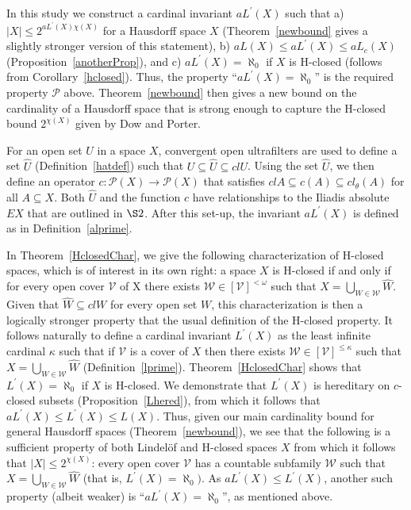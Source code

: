 \documentclass[11pt]{amsart}
\theoremstyle{definition}
\theoremstyle{remark}
\numberwithin{equation}{section}
\begin{document}
In this study we construct a cardinal invariant $aL^\prime(X)$ such that a) $|X|\leq 2^{aL^\prime(X)\chi(X)}$ for a Hausdorff space $X$ (Theorem~\ref{newbound} gives a slightly stronger version of this statement), b) $aL(X)\leq aL^\prime(X)\leq aL_c(X)$ (Proposition~\ref{anotherProp}), and c) $aL^\prime(X)=\aleph_0$ if $X$ is H-closed (follows from Corollary~\ref{hclosed}). Thus, the property ``$aL^\prime(X)=\aleph_0$'' is the required property ${\ensuremath{\mathcal{{P}}}}$ above. Theorem~\ref{newbound} then gives a new bound on the cardinality of a Hausdorff space that is strong enough to capture the H-closed bound $2^{\chi(X)}$ given by Dow and Porter.

For an open set $U$ in a space $X$, convergent open ultrafilters are used to define a set $\widehat{U}$  (Definition~\ref{hatdef}) such that $U{\subseteq}\widehat{U}{\subseteq} clU$. Using the set $\widehat{U}$, we then define an operator $c:{\ensuremath{\mathcal{{P}}}}(X)\to{\ensuremath{\mathcal{{P}}}}(X)$ that satisfies $clA{\subseteq} c(A){\subseteq} cl_\theta(A)$ for all $A{\subseteq} X$. Both $\widehat{U}$ and the function $c$ have relationships to the Iliadis absolute $EX$ that are outlined in $\S 2$. After this set-up, the invariant $aL^\prime(X)$ is defined as in Definition~\ref{alprime}.

In Theorem~\ref{HclosedChar}, we give the following characterization of H-closed spaces, which is of interest in its own right: a space $X$ is H-closed if and only if for every open cover ${\ensuremath{\mathcal{{V}}}}$ of X there exists ${\ensuremath{\mathcal{{W}}}}\in[{\ensuremath{\mathcal{{V}}}}]^{<\omega}$ such that $X={\bigcup}_{W\in{\ensuremath{\mathcal{{W}}}}}\widehat{W}$. Given that $\widehat{W}{\subseteq} clW$ for every open set $W$, this characterization is then a logically stronger property that the usual definition of the H-closed property. It follows naturally to define a cardinal invariant $L^\prime(X)$ as the least infinite cardinal $\kappa$ such that if ${\ensuremath{\mathcal{{V}}}}$ is a cover of $X$ then there exists ${\ensuremath{\mathcal{{W}}}}\in[{\ensuremath{\mathcal{{V}}}}]^{\leq\kappa}$ such that $X={\bigcup}_{W\in{\ensuremath{\mathcal{{W}}}}}\widehat{W}$ (Definition~\ref{lprime}). Theorem~\ref{HclosedChar} shows that $L^\prime(X)=\aleph_0$ if $X$ is H-closed. We demonstrate that $L^\prime(X)$ is hereditary on $c$-closed subsets (Proposition~\ref{Lhered}), from which it follows that $aL^\prime(X)\leq L^\prime(X)\leq L(X)$. Thus, given our main cardinality bound for general Hausdorff spaces (Theorem~\ref{newbound}), we see that the following is a sufficient property of both Lindel\"of and H-closed spaces $X$ from which it follows that $|X|\leq 2^{\chi(X)}$: every open cover ${\ensuremath{\mathcal{{V}}}}$ has a countable subfamily ${\ensuremath{\mathcal{{W}}}}$ such that $X={\bigcup}_{W\in{\ensuremath{\mathcal{{W}}}}}\widehat{W}$ (that is, $L^\prime(X)=\aleph_0)$. As $aL^\prime(X)\leq L^\prime(X)$, another such property (albeit weaker) is ``$aL^\prime(X)=\aleph_0$'', as mentioned above.
\end{document}
